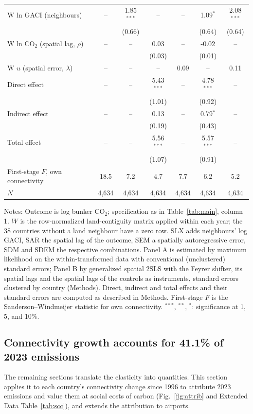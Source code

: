 \documentclass[12pt]{extarticle}
\begin{document}
\begin{table}[H]
{\begin{threeparttable}
\begin{tabular}{lcccccc}
  W ln GACI (neighbours) & -- & 1.85$^{***}$ & -- & -- & 1.09$^{*}$ & 2.08$^{***}$ \\
   &  & (0.66) &  &  & (0.64) & (0.64) \\
  W ln CO$_2$ (spatial lag, $\rho$) & -- & -- & 0.03 & -- & -0.02 & -- \\
   &  &  & (0.03) &  & (0.01) &  \\
  W $u$ (spatial error, $\lambda$) & -- & -- & -- & 0.09 & -- & 0.11 \\
  Direct effect & -- & -- & 5.43$^{***}$ & -- & 4.78$^{***}$ & -- \\
   &  &  & (1.01) &  & (0.92) &  \\
  Indirect effect & -- & -- & 0.13 & -- & 0.79$^{*}$ & -- \\
   &  &  & (0.19) &  & (0.43) &  \\
  Total effect & -- & -- & 5.56$^{***}$ & -- & 5.57$^{***}$ & -- \\
   &  &  & (1.07) &  & (0.91) &  \\
  First-stage $F$, own connectivity & 18.5 & 7.2 & 4.7 & 7.7 & 6.2 & 5.2 \\
  $N$ & 4,634 & 4,634 & 4,634 & 4,634 & 4,634 & 4,634 \\
\bottomrule
\end{tabular}
\begin{tablenotes}[flushleft]
\footnotesize
\item Notes: Outcome is log bunker CO$_2$; specification as in Table~\ref{tab:main}, column 1. $W$ is the row-normalized land-contiguity matrix applied within each year; the 38 countries without a land neighbour have a zero row. SLX adds neighbours' log GACI, SAR the spatial lag of the outcome, SEM a spatially autoregressive error, SDM and SDEM the respective combinations. Panel A is estimated by maximum likelihood on the within-transformed data with conventional (unclustered) standard errors; Panel B by generalized spatial 2SLS with the Feyrer shifter, its spatial lags and the spatial lags of the controls as instruments, standard errors clustered by country (Methods). Direct, indirect and total effects and their standard errors are computed as described in Methods. First-stage $F$ is the Sanderson--Windmeijer statistic for own connectivity. $^{***}$, $^{**}$, $^{*}$: significance at 1, 5, and 10\%.
\end{tablenotes}
\end{threeparttable}}
\end{table}

\subsection*{Connectivity growth accounts for 41.1\% of 2023
emissions}
The remaining sections translate the elasticity into quantities. This
section applies it to each country's connectivity change since 1996 to
attribute 2023 emissions and value them at social costs of carbon
(Fig.~\ref{fig:attrib} and Extended Data Table~\ref{tab:scc}), and extends the
attribution to airports.
\end{document}
